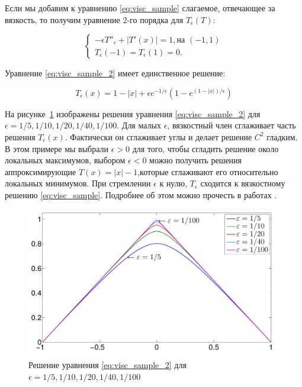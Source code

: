 Если мы добавим к уравнению \eqref{eq:visc_sample} слагаемое,
отвечающее за вязкость, то получим уравнение 2-го порядка для
$T_\epsilon(T)$:

\begin{equation}
  \label{eq:visc_sample_2}
  \left\{ \begin{matrix}
      -\epsilon T''_\epsilon+|T'(x)| = 1,\text{на } (-1,1) \\
      T_\epsilon(-1) = T_\epsilon(1) = 0.
    \end{matrix}\right.
\end{equation}

Уравнение \eqref{eq:visc_sample_2} имеет единственное решение:

\begin{equation*}
  T_\epsilon(x) = 1 - |x| + \epsilon e^{-1/\epsilon}(1 - e^{(1-|x|)/\epsilon})
\end{equation*}


На рисунке~\ref{fig:viscosity-experiment} изображены решения уравнения
\eqref{eq:visc_sample_2} для  $\epsilon =
1/5,1/10,1/20,1/40,1/100$. Для малых $\epsilon$, вязкостный член
сглаживает часть решения $T_\epsilon(x)$. Фактически он сглаживает
углы и делает решение $C^2$ гладким. В этом примере мы выбрали
$\epsilon >0$ для того, чтобы сгладить решение около локальных максимумов, выбором
$\epsilon <0$ можно получить решения аппроксимирующие $T(x) = |x| -
1$,которые сглаживают его относительно локальных минимумов. При
стремлении $\epsilon$ к нулю, $T_\epsilon$ сходится к вязкостному
решению \eqref{eq:visc_sample}. Подробнее об этом можно прочесть в
работах \cite{V1984,V1983}.


\begin{figure}[h]
  \centering
  \includegraphics[width=\linewidth]{img/viscosity_example.png}
  \hfil \caption{Решение уравнения \eqref{eq:visc_sample_2} для $\epsilon = 1/5, 1/10, 1/20, 1/40, 1/100$}
  \label{fig:viscosity-experiment}

\end{figure}


